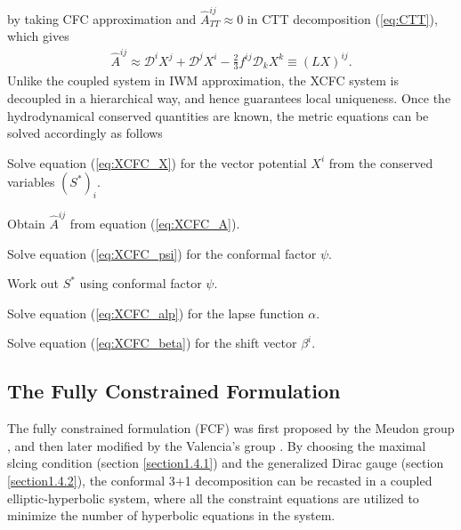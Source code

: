 by taking CFC approximation and $\hat{A}^{ij}_{TT} \approx 0$ in CTT decomposition (\cref{eq:CTT}),
which gives
\begin{align}\label{eq:XCFC_A}
    \hat{A}^{ij} \approx \mathcal{D}^i X^j + \mathcal{D}^j X^i - \frac{2}{3} f^{ij} \mathcal{D}_k X^k \equiv \left(LX \right)^{ij}.
\end{align}
Unlike the coupled system in IWM approximation, the XCFC system is decoupled in a hierarchical way,
and hence guarantees local uniqueness.
Once the hydrodynamical conserved quantities are known,
the metric equations can be solved accordingly as follows
\begin{Step}
    \item Solve equation (\ref{eq:XCFC_X}) for the vector potential $X^i$ from the conserved variables $\left(S^*\right)_i$.
    \item Obtain $\hat{A}^{ij}$ from equation (\ref{eq:XCFC_A}).
    \item Solve equation (\ref{eq:XCFC_psi}) for the conformal factor $\psi$.
    \item Work out $S^*$ using conformal factor $\psi$.
    \item Solve equation (\ref{eq:XCFC_alp}) for the lapse function $\alpha$.
    \item Solve equation (\ref{eq:XCFC_beta}) for the shift vector $\beta^i$.
\end{Step}

\subsection{The Fully Constrained Formulation}  %
\label{section1.5.2}
The fully constrained formulation (FCF) was first proposed by the Meudon group \cite{bonazzola2004constrained},
and then later modified by the Valencia's group \cite{cordero2008mathematical,cordero2009improved,cordero2012gravitational}.
By choosing the maximal slcing condition (section \ref{section1.4.1}) and the generalized Dirac gauge (section \ref{section1.4.2}),
the conformal 3+1 decomposition can be recasted in a coupled elliptic-hyperbolic system,
where all the constraint equations are utilized to minimize the number of hyperbolic equations in the system.

